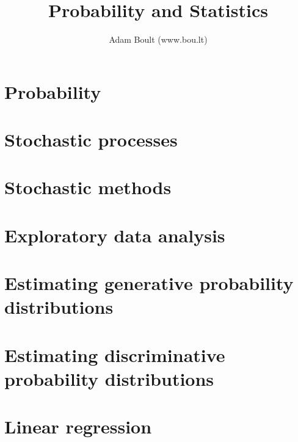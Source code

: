 \documentclass[oneside]{book}
\begin{document}
\author{Adam Boult (www.bou.lt)}
\title{Probability and Statistics}
\maketitle

\setcounter{tocdepth}{1}
\tableofcontents



\part{Probability}








\part{Stochastic processes}





\part{Stochastic methods}




\part{Exploratory data analysis}









\part{Estimating generative probability distributions}












\part{Estimating discriminative probability distributions}




\part{Linear regression}






\end{document}
